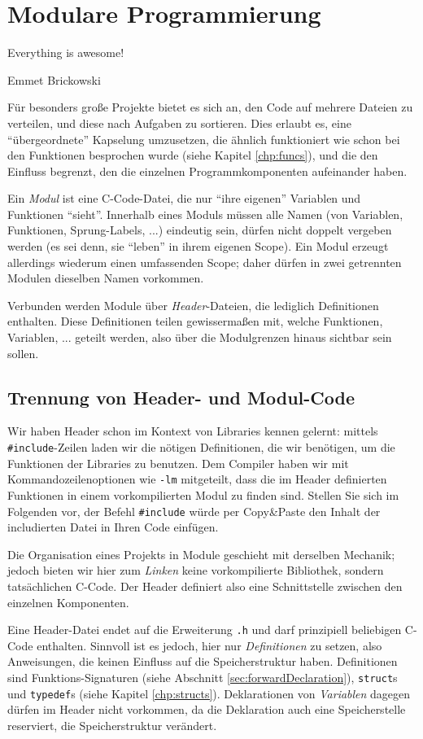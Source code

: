 \chapter{Modulare Programmierung}\label{chp:modules}
\epigraph{Everything is awesome!}{Emmet Brickowski}

Für besonders große Projekte bietet es sich an, den Code auf mehrere Dateien zu verteilen, und diese nach Aufgaben zu sortieren. Dies erlaubt es, eine \enquote{übergeordnete} Kapselung umzusetzen, die ähnlich funktioniert wie schon bei den Funktionen besprochen wurde (siehe Kapitel \ref{chp:funcs}), und die den Einfluss begrenzt, den die einzelnen Programmkomponenten aufeinander haben.

Ein \emph{Modul} ist eine C-Code-Datei, die nur \enquote{ihre eigenen} Variablen und Funktionen \enquote{sieht}. Innerhalb eines Moduls müssen alle Namen (von Variablen, Funktionen, Sprung-Labels, ...) eindeutig sein, \ie dürfen nicht doppelt vergeben werden (es sei denn, sie \enquote{leben} in ihrem eigenen Scope). Ein Modul erzeugt allerdings wiederum einen umfassenden Scope; daher dürfen in zwei getrennten Modulen dieselben Namen vorkommen.

Verbunden werden Module über \emph{Header}-Dateien, die lediglich Definitionen enthalten. Diese Definitionen teilen gewissermaßen mit, welche Funktionen, Variablen, ... geteilt werden, also über die Modulgrenzen hinaus sichtbar sein sollen.

\section{Trennung von Header- und Modul-Code}
Wir haben Header schon im Kontext von Libraries kennen gelernt: mittels \texttt{#include}-Zeilen laden wir die nötigen Definitionen, die wir benötigen, um die Funktionen der Libraries zu benutzen. Dem Compiler haben wir mit Kommandozeilenoptionen wie \texttt{-lm} mitgeteilt, dass die im Header definierten Funktionen in einem vorkompilierten Modul zu finden sind. Stellen Sie sich im Folgenden vor, der Befehl \texttt{#include} würde per Copy\&Paste den Inhalt der includierten Datei in Ihren Code einfügen.

Die Organisation eines Projekts in Module geschieht mit derselben Mechanik; jedoch bieten wir hier zum \emph{Linken} keine vorkompilierte Bibliothek, sondern tatsächlichen C-Code. Der Header definiert also eine Schnittstelle zwischen den einzelnen Komponenten.

Eine Header-Datei endet auf die Erweiterung \texttt{.h} und darf prinzipiell beliebigen C-Code enthalten. Sinnvoll ist es jedoch, hier nur \emph{Definitionen} zu setzen, also Anweisungen, die keinen Einfluss auf die Speicherstruktur haben. Definitionen sind \eg Funktions-Signaturen (siehe Abschnitt \ref{sec:forwardDeclaration}), \texttt{struct}s und \texttt{typedef}s (siehe Kapitel \ref{chp:structs}). Deklarationen von \emph{Variablen} dagegen dürfen im Header nicht vorkommen, da die Deklaration auch eine Speicherstelle reserviert, \ie die Speicherstruktur verändert.

